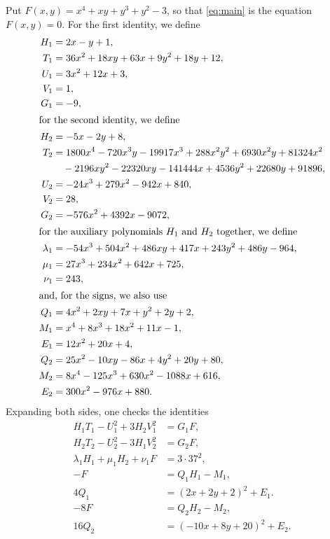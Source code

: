 \documentclass[11pt]{article}
\begin{document}
Put $F(x,y)=x^{4}+xy+y^{3}+y^{2}-3$, so that \eqref{eq:main} is the equation $F(x,y)=0$. For the first identity, we define
\begin{align*}
H_{1}&=2x-y+1,\\
T_{1}&=36x^{2}+18xy+63x+9y^{2}+18y+12,\\
U_{1}&=3x^{2}+12x+3,\\
V_{1}&=1,\\
G_{1}&=-9,\\
\intertext{for the second identity, we define}
H_{2}&=-5x-2y+8,\\
T_{2}&=1800x^{4}-720x^{3}y-19917x^{3}+288x^{2}y^{2}+6930x^{2}y+81324x^{2}\\
&\quad-2196xy^{2}-22320xy-141444x+4536y^{2}+22680y+91896,\\
U_{2}&=-24x^{3}+279x^{2}-942x+840,\\
V_{2}&=28,\\
G_{2}&=-576x^{2}+4392x-9072,\\
\intertext{for the auxiliary polynomials $H_{1}$ and $H_{2}$ together, we define}
\lambda_{1}&=-54x^{3}+504x^{2}+486xy+417x+243y^{2}+486y-964,\\
\mu_{1}&=27x^{3}+234x^{2}+642x+725,\\
\nu_{1}&=243,\\
\intertext{and, for the signs, we also use}
Q_{1}&=4x^{2}+2xy+7x+y^{2}+2y+2,\\
M_{1}&=x^{4}+8x^{3}+18x^{2}+11x-1,\\
E_{1}&=12x^{2}+20x+4,\\
Q_{2}&=25x^{2}-10xy-86x+4y^{2}+20y+80,\\
M_{2}&=8x^{4}-125x^{3}+630x^{2}-1088x+616,\\
E_{2}&=300x^{2}-976x+880.
\end{align*}
Expanding both sides, one checks the identities
\begin{align}
H_{1}T_{1}-U_{1}^2+3H_{2}V_{1}^2&=G_{1}F,\label{eq:norm1}\\
H_{2}T_{2}-U_{2}^2-3H_{1}V_{2}^2&=G_{2}F,\label{eq:norm2}\\
\lambda_{1}H_{1}+\mu_{1}H_{2}+\nu_{1}F&=3\cdot 37^{2},\label{eq:cross1}\\
-F&=Q_{1}H_{1}-M_{1},\label{eq:sign1}\\
4Q_{1}&=(2x+2y+2)^2+E_{1}.\label{eq:sign1b}\\
-8F&=Q_{2}H_{2}-M_{2},\label{eq:sign2}\\
16Q_{2}&=(-10x+8y+20)^2+E_{2}.\label{eq:sign2b}
\end{align}
\end{document}
